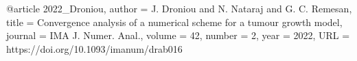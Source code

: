 @article{
      2022_Droniou,
	author  = {J. Droniou and N. Nataraj and G. C. Remesan},
	title   = {Convergence analysis of a numerical scheme for a tumour growth model},
	journal = 	{IMA J. Numer. Anal.},
	volume = {42},
	number = {2},
	year = {2022},
	URL = {https://doi.org/10.1093/imanum/drab016}
}